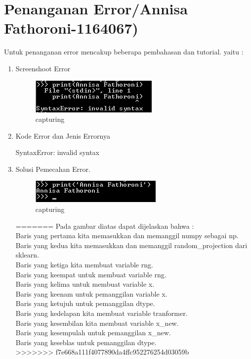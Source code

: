 \section{Penanganan Error/Annisa Fathoroni-1164067)}
Untuk penanganan error mencakup beberapa pembahasan dan tutorial. yaitu :
\begin{enumerate}
\item Screenshoot Error

\begin{figure}[ht]
\centering
\includegraphics[scale=0.5]{figures/Capture8.png}
\caption{capturing}
\label{loading an example dataset}
\end{figure}

\item Kode Error dan Jenis Errornya

SyntaxError: invalid syntax

\item Solusi Pemecahan Error.

\begin{figure}[ht]
\centering
\includegraphics[scale=0.5]{figures/Capture9.png}
\caption{capturing}
\label{loading an example dataset}
\end{figure}
=======
Pada gambar diatas dapat dijelaskan bahwa :\\
Baris yang pertama kita memasukkan dan memanggil numpy sebagai np.\\
Baris yang kedua kita memasukkan dan memanggil random_projection dari sklearn.\\
Baris yang ketiga kita  membuat variable rng.\\
Baris yang keempat untuk  membuat variable rng.\\
Baris yang kelima untuk  membuat variable x.\\
Baris yang keenam untuk  pemanggilan variable x.\\
Baris yang ketujuh untuk pemanggilan dtype.\\
Baris yang kedelapan kita membuat variable tranformer.\\
Baris yang kesembilan kita membuat variable x_new.\\
Baris yang kesempulah untuk  pemanggilan x_new.\\
Baris yang keseblas untuk  pemanggilan dtype.\\
>>>>>>> f7e668a111f4077890da4ffc952276254d03059b

\end{enumerate}